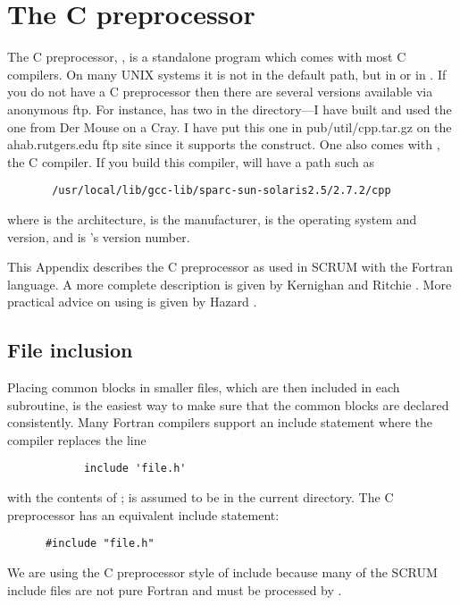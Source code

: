 \section{The C preprocessor}
\label{Cpp}

The C preprocessor, , is a standalone program which comes
with most C compilers.  On many UNIX systems it is not in the default
path, but in  or in .  If you do not have a C
preprocessor then there are several versions available via anonymous
ftp.  For instance,  has two in the
 directory---I have built and
used the one from Der Mouse on a Cray.  I have put this one in
pub/util/cpp.tar.gz on the ahab.rutgers.edu ftp site since it supports
the  construct.  One also comes with ,
the  C compiler.  If you build this compiler,  will
have a path such as

\begin{verbatim}
       /usr/local/lib/gcc-lib/sparc-sun-solaris2.5/2.7.2/cpp
\end{verbatim}
where  is the architecture,  is  the
manufacturer,  is the operating system and version,
and  is 's version number.

This Appendix describes the C preprocessor as used in SCRUM with the
Fortran language.  A more complete description is given by
Kernighan and Ritchie \cite{K&R}.  More practical advice on using
 is given by Hazard \cite{Hazard}.

\subsection{File inclusion}
Placing common blocks in smaller files, which are then included in each
subroutine, is the easiest way to make sure that the common blocks are
declared consistently.  Many Fortran compilers support an include
statement where the compiler replaces the line
\begin{verbatim}
            include 'file.h'
\end{verbatim}
with the contents of ;  is assumed
to be in the current directory.  The C preprocessor has an equivalent
include statement:
\begin{verbatim}
      #include "file.h"
\end{verbatim}
We are using the C preprocessor style of include because many of the
SCRUM include files are not pure Fortran and must be processed by
.

